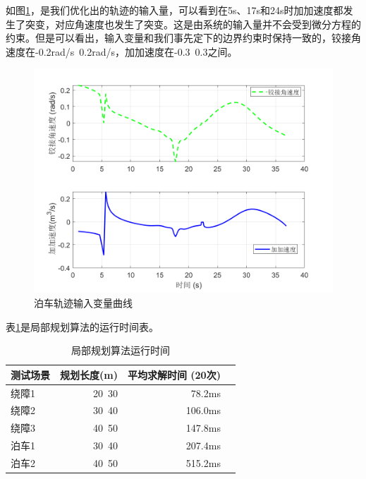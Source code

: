 \documentclass[master,academic]{ysuthesis} %
\begin{document}
		如图\ref{fig:databocheinput}，是我们优化出的轨迹的输入量，可以看到在5s、17s和24s时加加速度都发生了突变，对应角速度也发生了突变。这是由系统的输入量并不会受到微分方程的约束。但是可以看出，输入变量和我们事先定下的边界约束时保持一致的，铰接角速度在-0.2rad/s~0.2rad/s，加加速度在-0.3~0.3之间。
		\begin{figure}[!ht]
			\centering
			\includegraphics[width=1\textwidth]{databocheinput.png}
			\caption{泊车轨迹输入变量曲线}
			\label{fig:databocheinput}
		\end{figure}

		表\ref{tab:local_planning_boche_time}是局部规划算法的运行时间表。
		\begin{table}[!ht]
			\caption{局部规划算法运行时间}
			\label{tab:local_planning_boche_time}
			\centering
			\begin{tabular}{l rrr}
				\toprule
				测试场景   & 规划长度(m) & 平均求解时间 (20次) \\
				\midrule
				绕障1 & 20~30    & 78.2ms   \\
				绕障2 & 30~40    & 106.0ms  \\
				绕障3 & 40~50    & 147.8ms  \\
				泊车1  & 30~40   & 207.4ms  \\
				泊车2  & 40~50   & 515.2ms  \\
				\bottomrule
			\end{tabular}
		\end{table}
\end{document}
